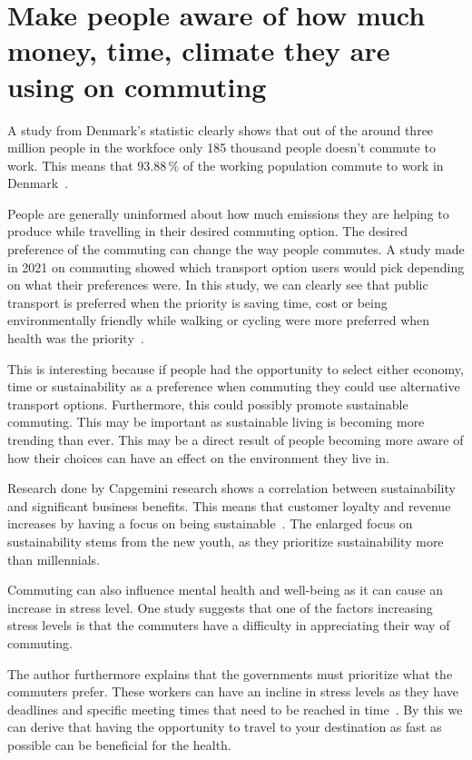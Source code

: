 \section{Make people aware of how much money, time, climate they are using on commuting}
\label{sec:make-people-aware-of-how-much-money-time-climate-they-are-using-on-commuting}

A study from Denmark’s statistic clearly shows that out of the around three million people in the workfoce only
185 thousand people doesn't commute to work.
This means that \(93.88\,\%\) of the working population commute to work in Denmark~\cite{erhvervspendling2021}.

People are generally uninformed about how much emissions they are helping to produce while travelling in their
desired commuting option.
The desired preference of the commuting can change the way people commutes.
A study made in 2021 on commuting showed which transport option users would pick depending on what their preferences
were.
In this study, we can clearly see that public transport is preferred when the priority is saving time, cost or being
environmentally friendly while walking or cycling were more preferred when health was the priority~\cite{spark2023}.

This is interesting because if people had the opportunity to select either economy, time or sustainability as a
preference when commuting they could use alternative transport options.
Furthermore, this could possibly promote sustainable commuting.
This may be important as sustainable living is becoming more trending than ever.
This may be a direct result of people becoming more aware of how their choices can have an effect on the environment they
live in.

Research done by Capgemini research shows a correlation between sustainability and significant business benefits.
This means that customer loyalty and revenue increases by having a focus on being sustainable~\cite{capgemini2020}.
The enlarged focus on sustainability stems from the new youth, as they prioritize sustainability more than millennials.

Commuting can also influence mental health and well-being as it can cause an increase in stress level.
One study suggests that one of the factors increasing stress levels is that the commuters have a difficulty in
appreciating their way of commuting.

The author furthermore explains that the governments must prioritize what the commuters prefer.
These workers can have an incline in stress levels as they have deadlines and specific meeting times that need to be
reached in time~\cite{koslowsky2013}.
By this we can derive that having the opportunity to travel to your destination as fast as possible can be beneficial
for the health.

